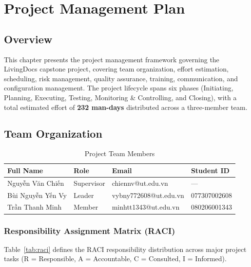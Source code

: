 \chapter{Project Management Plan}

\section{Overview}

This chapter presents the project management framework governing the LivingDocs
capstone project, covering team organization, effort estimation, scheduling, risk
management, quality assurance, training, communication, and configuration management.
The project lifecycle spans six phases (Initiating, Planning, Executing, Testing,
Monitoring \& Controlling, and Closing), with a total estimated effort of
\textbf{232 man-days} distributed across a three-member team.

\section{Team Organization}

\begin{table}[htbp]
\centering
\caption{Project Team Members}
\begin{tabular}{|l|l|l|l|}
\hline
\textbf{Full Name} & \textbf{Role} & \textbf{Email} & \textbf{Student ID} \\
\hline
\hline
Nguyễn Văn Chiến & Supervisor & chiennv@ut.edu.vn & --- \\
\hline
Bùi Nguyễn Yến Vy & Leader & vybny772608@ut.edu.vn & 077307002608 \\
\hline
Trần Thanh Minh & Member & minhtt1343@ut.edu.vn & 080206001343 \\
\hline
\hline
\end{tabular}
\end{table}

\subsection{Responsibility Assignment Matrix (RACI)}

Table~\ref{tab:raci} defines the RACI responsibility distribution across major
project tasks (R = Responsible, A = Accountable, C = Consulted, I = Informed).


